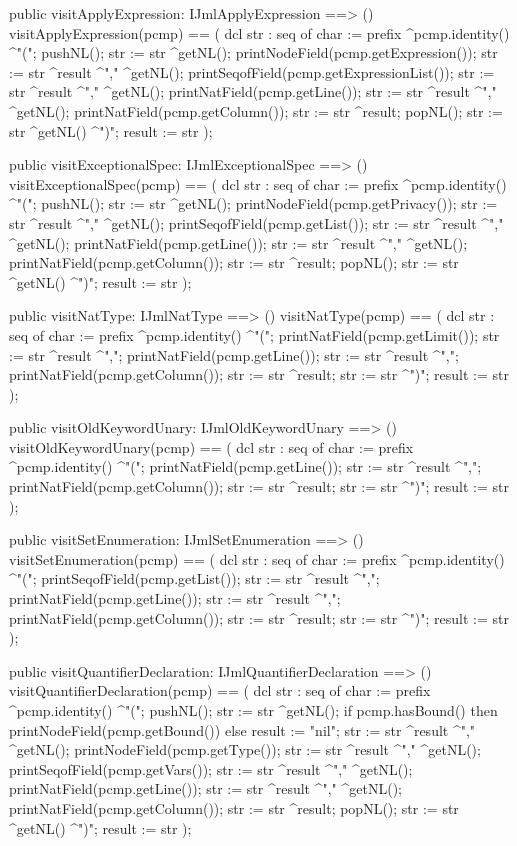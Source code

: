 \begin{vdm_al}
  public visitApplyExpression: IJmlApplyExpression ==> ()
  visitApplyExpression(pcmp) ==
    ( dcl str : seq of char := prefix ^pcmp.identity() ^"(";
      pushNL();
      str := str ^getNL();
      printNodeField(pcmp.getExpression());
      str := str ^result ^"," ^getNL();
      printSeqofField(pcmp.getExpressionList());
      str := str ^result ^"," ^getNL();
      printNatField(pcmp.getLine());
      str := str ^result ^"," ^getNL();
      printNatField(pcmp.getColumn());
      str := str ^result;
      popNL();
      str := str ^getNL() ^")";
      result := str );

  public visitExceptionalSpec: IJmlExceptionalSpec ==> ()
  visitExceptionalSpec(pcmp) ==
    ( dcl str : seq of char := prefix ^pcmp.identity() ^"(";
      pushNL();
      str := str ^getNL();
      printNodeField(pcmp.getPrivacy());
      str := str ^result ^"," ^getNL();
      printSeqofField(pcmp.getList());
      str := str ^result ^"," ^getNL();
      printNatField(pcmp.getLine());
      str := str ^result ^"," ^getNL();
      printNatField(pcmp.getColumn());
      str := str ^result;
      popNL();
      str := str ^getNL() ^")";
      result := str );

  public visitNatType: IJmlNatType ==> ()
  visitNatType(pcmp) ==
    ( dcl str : seq of char := prefix ^pcmp.identity() ^"(";
      printNatField(pcmp.getLimit());
      str := str ^result ^",";
      printNatField(pcmp.getLine());
      str := str ^result ^",";
      printNatField(pcmp.getColumn());
      str := str ^result;
      str := str ^")";
      result := str );

  public visitOldKeywordUnary: IJmlOldKeywordUnary ==> ()
  visitOldKeywordUnary(pcmp) ==
    ( dcl str : seq of char := prefix ^pcmp.identity() ^"(";
      printNatField(pcmp.getLine());
      str := str ^result ^",";
      printNatField(pcmp.getColumn());
      str := str ^result;
      str := str ^")";
      result := str );

  public visitSetEnumeration: IJmlSetEnumeration ==> ()
  visitSetEnumeration(pcmp) ==
    ( dcl str : seq of char := prefix ^pcmp.identity() ^"(";
      printSeqofField(pcmp.getList());
      str := str ^result ^",";
      printNatField(pcmp.getLine());
      str := str ^result ^",";
      printNatField(pcmp.getColumn());
      str := str ^result;
      str := str ^")";
      result := str );

  public visitQuantifierDeclaration: IJmlQuantifierDeclaration ==> ()
  visitQuantifierDeclaration(pcmp) ==
    ( dcl str : seq of char := prefix ^pcmp.identity() ^"(";
      pushNL();
      str := str ^getNL();
      if pcmp.hasBound()
      then printNodeField(pcmp.getBound())
      else result := "nil";
      str := str ^result ^"," ^getNL();
      printNodeField(pcmp.getType());
      str := str ^result ^"," ^getNL();
      printSeqofField(pcmp.getVars());
      str := str ^result ^"," ^getNL();
      printNatField(pcmp.getLine());
      str := str ^result ^"," ^getNL();
      printNatField(pcmp.getColumn());
      str := str ^result;
      popNL();
      str := str ^getNL() ^")";
      result := str );


\end{vdm_al}
